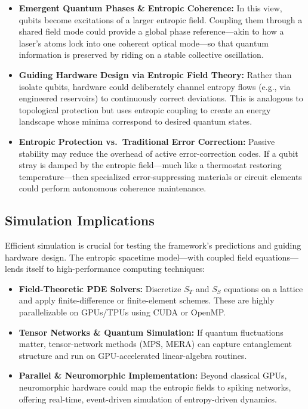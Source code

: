 \documentclass[11pt,a4paper]{article} %
\begin{document}
\begin{itemize}
  \item \textbf{Emergent Quantum Phases \& Entropic Coherence:} In this view, qubits become excitations of a larger entropic field. Coupling them through a shared field mode could provide a global phase reference—akin to how a laser’s atoms lock into one coherent optical mode—so that quantum information is preserved by riding on a stable collective oscillation.
  
  \item \textbf{Guiding Hardware Design via Entropic Field Theory:} Rather than isolate qubits, hardware could deliberately channel entropy flows (e.g., via engineered reservoirs) to continuously correct deviations. This is analogous to topological protection but uses entropic coupling to create an energy landscape whose minima correspond to desired quantum states.
  
  \item \textbf{Entropic Protection vs.\ Traditional Error Correction:} Passive stability may reduce the overhead of active error-correction codes. If a qubit stray is damped by the entropic field—much like a thermostat restoring temperature—then specialized error-suppressing materials or circuit elements could perform autonomous coherence maintenance.
\end{itemize}

\subsection{Simulation Implications}
Efficient simulation is crucial for testing the framework’s predictions and guiding hardware design. The entropic spacetime model—with coupled field equations—lends itself to high-performance computing techniques:

\begin{itemize}
  \item \textbf{Field-Theoretic PDE Solvers:} Discretize \(S_T\) and \(S_S\) equations on a lattice and apply finite-difference or finite-element schemes. These are highly parallelizable on GPUs/TPUs using CUDA or OpenMP.
  
  \item \textbf{Tensor Networks \& Quantum Simulation:} If quantum fluctuations matter, tensor-network methods (MPS, MERA) can capture entanglement structure and run on GPU-accelerated linear-algebra routines.
  
  \item \textbf{Parallel \& Neuromorphic Implementation:} Beyond classical GPUs, neuromorphic hardware could map the entropic fields to spiking networks, offering real-time, event-driven simulation of entropy-driven dynamics.
\end{itemize}
\end{document}

